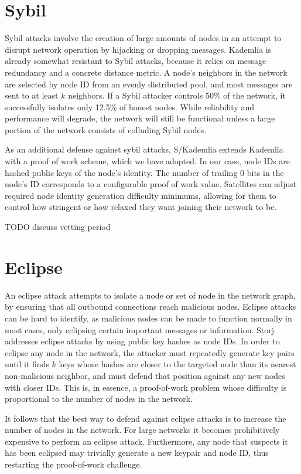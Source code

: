 \documentclass[11pt,fleqn,openany]{book}
\newcommand{\todo}[1]{{\color{red} TODO #1 }}
\begin{document}
\section{Sybil}

Sybil attacks involve the creation of large amounts of nodes in an attempt to
disrupt network operation by hijacking or dropping messages. Kademlia
\cite{kademlia} is already somewhat resistant to Sybil attacks, because
it relies on message redundancy and a concrete distance metric.
A node's neighbors in the network are selected by
node ID from an evenly distributed pool, and most messages are sent to at least
$k$ neighbors. If a Sybil attacker controls 50\% of the network, it
successfully isolates only 12.5\% of honest nodes. While reliability and
performance will degrade, the network will still be functional unless a large
portion of the network consists of colluding Sybil nodes.

As an additional defense against sybil attacks, S/Kademlia \cite{s-kademlia}
extends Kademlia with a proof of work scheme, which we have adopted. In our
case, node IDs are hashed public keys of the node's identity.
The number of trailing 0 bits in the node's ID corresponds to a configurable
proof of work value.
Satellites can adjust required node identity generation difficulty minimums,
allowing for them to control how stringent or how relaxed they want joining
their network to be.

\todo{discuss vetting period}

\section{Eclipse}

An eclipse attack attempts to isolate a node or set of node in the network
graph, by ensuring that all outbound connections reach malicious nodes. Eclipse
attacks can be hard to identify, as malicious nodes can be made to function
normally in most cases, only eclipsing certain important messages or
information. Storj addresses eclipse attacks by using public key hashes as node
IDs. In order to eclipse any node in the network, the attacker must repeatedly
generate key pairs until it finds $k$ keys whose hashes are closer to the
targeted node than its nearest non-malicious neighbor, and must defend that
position against any new nodes with closer IDs. This is, in essence, a
proof-of-work problem whose difficulty is proportional to the number of nodes in
the network.

It follows that the best way to defend against eclipse attacks is to increase
the number of nodes in the network. For large networks it becomes prohibitively
expensive to perform an eclipse attack. Furthermore, any node that suspects it
has been eclipsed may trivially generate a new keypair and node ID, thus
restarting the proof-of-work challenge.
\end{document}
